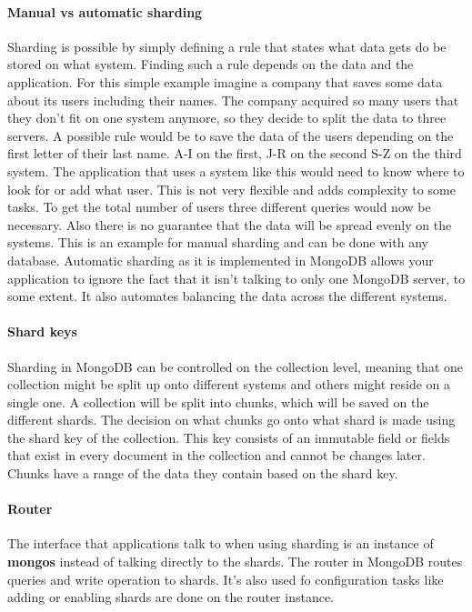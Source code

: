 \documentclass[11pt]{article}
\begin{document}
\paragraph{Manual vs automatic sharding}
Sharding is possible by simply defining a rule that states what data gets do be stored on what system.
Finding such a rule depends on the data and the application. 
For this simple example imagine a company that saves some data about its users including their names. The company acquired so many users that they don't fit on one system anymore, so they decide to split the data to three servers. 
A possible rule would be to save the data of the users depending on the first letter of their last name. A-I on the first, J-R on the second S-Z on the third system. 
The application that uses a system like this would need to know where to look for or add what user. This is not very flexible and adds complexity to some tasks. 
To get the total number of users three different queries would now be necessary. Also there is no guarantee that the data will be spread evenly on the systems. 
This is an example for manual sharding and can be done with any database.
Automatic sharding as it is implemented in MongoDB allows your application to ignore the fact that it isn't talking to only one MongoDB server, to some extent. 
It also automates balancing the data across the different systems. 

\paragraph{Shard keys}
Sharding in MongoDB can be controlled on the collection level, meaning that one collection might be split up onto different systems and others might reside on a single one.
A collection will be split into chunks, which will be saved on the different shards.
The decision on what chunks go onto what shard is made using the shard key of the collection. 
This key consists of an immutable field or fields that exist in every document in the collection and cannot be changes later. 
Chunks have a range of the data they contain based on the shard key.

\paragraph{Router}
The interface that applications talk to when using sharding is an instance of \textbf{mongos} instead of talking directly to the shards. 
The router in MongoDB routes queries and write operation to shards. 
It's also used fo configuration tasks like adding or enabling shards are done on the router instance.
\end{document}

